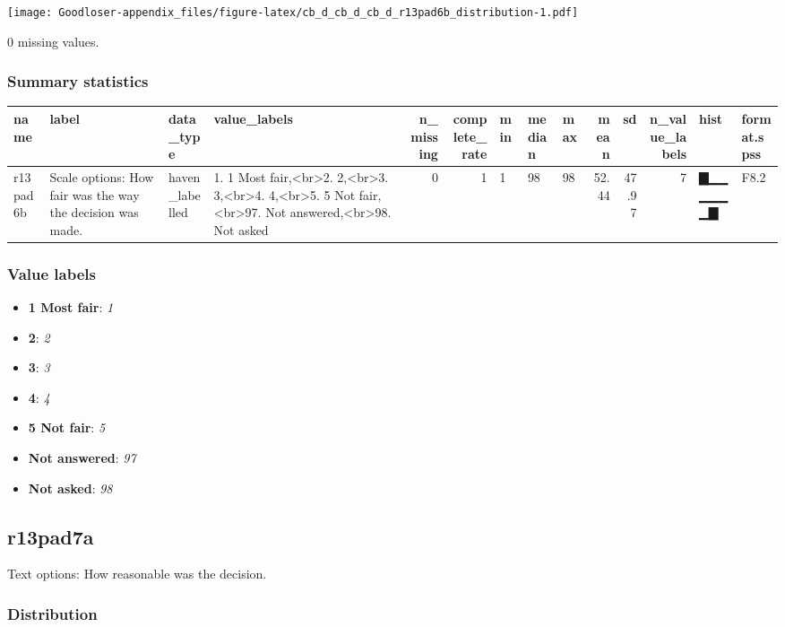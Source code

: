 \documentclass[
]{book}
\providecommand{\tightlist}{%
  \setlength{\itemsep}{0pt}\setlength{\parskip}{0pt}}
\begin{document}
\texttt{[image: Goodloser-appendix\_files/figure-latex/cb\_d\_cb\_d\_cb\_d\_r13pad6b\_distribution-1.pdf]}

0 missing values.

\hypertarget{r13pad6b_summary}{%
\subsubsection{Summary statistics}\label{r13pad6b_summary}}

\begin{tabular}{l|l|l|l|r|r|l|l|l|r|r|r|l|l}
\hline
name & label & data_type & value_labels & n_missing & complete_rate & min & median & max & mean & sd & n_value_labels & hist & format.spss\\
\hline
r13pad6b & Scale options: How fair was the way the decision was made. & haven_labelled & 1. 1 Most fair,<br>2. 2,<br>3. 3,<br>4. 4,<br>5. 5 Not fair,<br>97. Not answered,<br>98. Not asked & 0 & 1 & 1 & 98 & 98 & 52.44 & 47.97 & 7 & ▇▁▁▁▁▁▁▇ & F8.2\\
\hline
\end{tabular}

\hypertarget{r13pad6b_labels}{%
\subsubsection{Value labels}\label{r13pad6b_labels}}

\begin{itemize}
\tightlist
\item
  \textbf{1 Most fair}: \emph{1}
\item
  \textbf{2}: \emph{2}
\item
  \textbf{3}: \emph{3}
\item
  \textbf{4}: \emph{4}
\item
  \textbf{5 Not fair}: \emph{5}
\item
  \textbf{Not answered}: \emph{97}
\item
  \textbf{Not asked}: \emph{98}
\end{itemize}

\hypertarget{r13pad7a}{%
\subsection{r13pad7a}\label{r13pad7a}}

Text options: How reasonable was the decision.

\hypertarget{r13pad7a_distribution}{%
\subsubsection{Distribution}\label{r13pad7a_distribution}}
\end{document}
